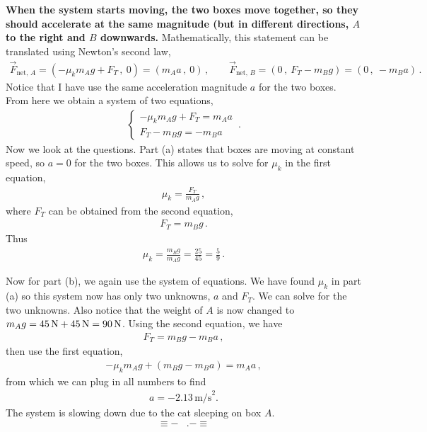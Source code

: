 \documentclass[11pt]{article}
\begin{document}
\textbf{When the system starts moving, the two boxes move together, so they should accelerate at the same magnitude (but in different directions, $A$ to the right and $B$ downwards.} Mathematically, this statement can be translated using Newton's second law, 
\begin{align*}
\vec{F}_{\text{net, }A} =\left(-\mu_k m_Ag + F_T\,,\ 0\right) = (m_A a\,,\ 0)\,,\qquad
\vec{F}_{\text{net, }B} = \left(0\,,\ F_T-m_Bg\right) = (0\,,\ -m_B a)\,.
\end{align*} 
Notice that I have use the same acceleration magnitude $a$ for the two boxes. From here we obtain a system of two equations, 
\begin{align*}
\begin{cases}
-\mu_k m_A g +F_T = m_A a\\
F_T - m_B g = -m_B a\end{cases} \,.
\end{align*}
Now we look at the questions. Part (a) states that boxes are moving at constant speed, so $a= 0$ for the two boxes. This allows us to solve for $\mu_k$ in the first equation, 
\begin{align*}
\mu_k = \frac{F_T}{m_Ag}\,,
\end{align*}
where $F_T$ can be obtained from the second equation, 
\begin{align*}
F_T = m_B g\,.
\end{align*}
Thus 
\begin{align*}
\mu_k = \frac{m_B g}{m_A g} = \frac{25}{45} = \frac{5}{9}\,.
\end{align*}

Now for part (b), we again use the system of equations. We have found $\mu_k$ in part (a) so this system now has only two unknowns, $a$ and $F_T$. We can solve for the two unknowns. Also notice that the weight of $A$ is now changed to $m_Ag = 45\text{\,N}+45\,\text{N} = 90\,\text{N}$. Using the second equation, we have
\begin{align*}
F_T = m_Bg - m_B a\,,
\end{align*}
then use the first equation,
\begin{align*}
-\mu_k m_A g + (m_B g - m_B a) =m_A a\,,
\end{align*}
from which we can plug in all numbers to find
\begin{align*}
a = -2.13\,\text{m/s}^2.
\end{align*}
The system is slowing down due to the cat sleeping on box $A$. 
\begin{align*}
\mathrm{\equiv -}&\mathrm{.-\equiv}
\end{align*}
\end{document}
